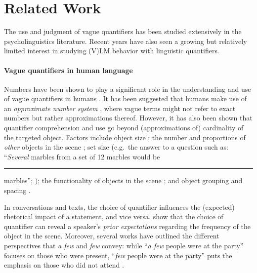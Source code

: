 \section{Related Work}
The use and judgment of vague quantifiers has been studied extensively in the psycholinguistics literature. 
Recent years have also seen a growing but relatively limited interest in studying (V)LM behavior with linguistic quantifiers. 

\paragraph{Vague quantifiers in human language}
Numbers have been shown to play a significant role in the understanding and use of vague quantifiers in humans \citep[see e.g.][]{solt_vagueness_2011}.
It has been suggested that humans make use of an \emph{approximate number system} \citep{feigenson2004-number, dehaene2011-numbersense, coventry2005-grounding}, where vague terms might not refer to exact numbers but rather approximations thereof.
However, it has also been shown that quantifier comprehension and use go beyond (approximations of) cardinality of the targeted object. 
Factors include object size \citep{hormann1983-calculating,newstead2000-context}; 
the number and proportions of \emph{other} objects in the scene \citep{coventry2005-grounding,coventry2010-space,pezzelle2018-mental};
set size (e.g.\ the answer to a question such as: ``\emph{Several} marbles from a set of 12 marbles would be \rule{0.3cm}{0.15mm} marbles''; \citealp{newstead1987-set});
the functionality of objects in the scene \citep{newstead2000-context}; and object grouping and spacing \citep{coventry2005-grounding}.

In conversations and texts, the choice of quantifier influences the (expected) rhetorical impact of a statement, and vice versa. \citet{moxey1993-prior} show that the choice of quantifier can reveal a speaker's \emph{prior expectations} regarding the frequency of the object in the scene. Moreover, several works have outlined the different perspectives that \textit{a few} and \textit{few} convey: while ``\emph{a few} people were at the party'' focuses on those who were present, ``\emph{few} people were at the party'' puts the emphasis on those who did not attend \citep{moxey2000-quantities,paterson2009-discourse}.

